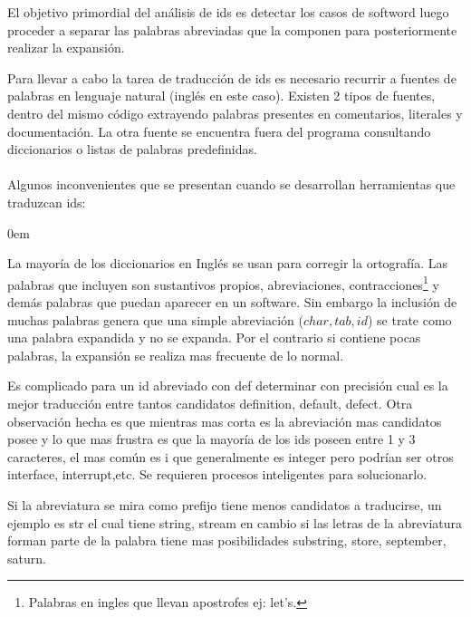 \documentclass[a4paper,12pt]{report}
\begin{document}
\begin{framed}
\noindent El objetivo primordial del análisis de ids es detectar los casos de softword luego proceder a separar las palabras abreviadas que la componen para posteriormente realizar la expansión\cite{FBL06,LFBEX07}.  
\end{framed}

Para llevar a cabo la tarea de traducción de ids es necesario recurrir a fuentes de palabras en lenguaje natural (inglés en este caso). Existen 2 tipos de fuentes, dentro del mismo código extrayendo palabras presentes en comentarios, literales y documentación. La otra fuente se encuentra fuera del programa consultando diccionarios o listas de palabras predefinidas.\\\\Algunos inconvenientes que se presentan cuando se desarrollan herramientas que traduzcan ids:

\begin{description}
\itemsep0em%
\item[Dificultad para armar diccionarios apropiados:]  La mayoría de los diccionarios en Inglés se usan para corregir la ortografía. Las palabras que incluyen son sustantivos propios, abreviaciones, contracciones\footnote[1]{Palabras en ingles que llevan apostrofes ej: let's.} y demás palabras que puedan aparecer en un software. Sin embargo la inclusión de muchas palabras genera que una simple abreviación ($char,tab,id$) se trate como una palabra expandida y no se expanda. Por el contrario si contiene pocas palabras, la expansión se realiza mas frecuente de lo normal.

\item[Las abreviaciones poseen muchos candidatos a expandir:] Es complicado para un id abreviado con \textsf{def} determinar con precisión cual es la mejor traducción entre tantos candidatos \textsf{definition, default, defect}. Otra observación hecha es que mientras mas corta es la abreviación mas candidatos posee y lo que mas frustra es que la mayoría de los ids poseen entre 1 y 3 caracteres, el mas común es \textsf{i} que generalmente es \textsf{integer} pero podrían ser otros \textsf{interface, interrupt},etc. Se requieren procesos inteligentes para solucionarlo.

\item[El tipo de la abreviación afecta el numero de candidatos:] Si la abreviatura se mira como prefijo tiene menos candidatos a traducirse, un ejemplo es \textsf{str} el cual tiene \textsf{string, stream} en cambio si las letras de la abreviatura forman parte de la palabra tiene mas posibilidades \textsf{substring, store, september, saturn}.
\end{description}
\end{document}
